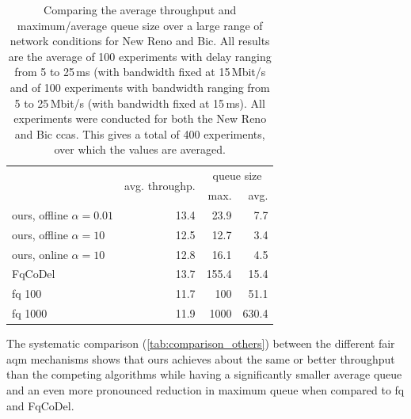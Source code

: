 \documentclass[conference]{IEEEtran}
\begin{document}
\begin{table}
\caption{Comparing the average throughput and maximum/average queue size over a large range of network conditions for New Reno and Bic. All results are the average of 100 experiments with delay ranging from 5 to 25\,ms (with bandwidth fixed at 15\,Mbit/s and of 100 experiments with bandwidth ranging from 5 to 25\,Mbit/s (with bandwidth fixed at 15\,ms). All experiments were conducted for both the New Reno and Bic \glspl{cca}. This gives a total of 400 experiments, over which the values are averaged.} \label{tab:comparison_others}
\centering
\begin{tabular}{l r r r} \toprule
& \multirow{2}{*}{avg. throughp.} & \multicolumn{2}{c}{queue size} \\
& & max. & avg. \\ \midrule
\gls{ours}, offline $\alpha=0.01$ & 13.4 & 23.9 & 7.7\\
\gls{ours}, offline $\alpha=10$ & 12.5 & 12.7 & 3.4\\
\gls{ours}, online $\alpha=10$ & 12.8 & 16.1 & 4.5\\
FqCoDel	& 13.7 & 155.4 & 15.4\\
fq 100	& 11.7 & 100 & 51.1\\
fq 1000	& 11.9 & 1000 & 630.4 \\
\bottomrule
\end{tabular}
\end{table}

The systematic comparison (\autoref{tab:comparison_others}) between the different fair \gls{aqm} mechanisms shows that \gls{ours} achieves about the same or better throughput than the competing algorithms while having a significantly smaller average queue and an even more pronounced reduction in maximum queue when compared to fq and FqCoDel.  
\end{document}
